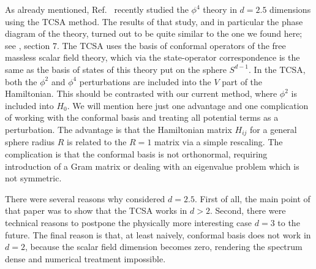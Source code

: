 \documentclass[11pt]{article}
\newcommand{\NO}[1]{{:\!#1\!:}}
\numberwithin{equation}{section}
\begin{document}
As already mentioned, Ref.~\cite{Hogervorst:2014rta} recently studied the $\phi^4$ theory in $d=2.5$ dimensions using the TCSA method. The results of that study, and in particular the phase diagram of the theory, turned out to be quite similar to the one we found here; see \cite{Hogervorst:2014rta}, section 7. The TCSA uses the basis of conformal operators of the free massless scalar field theory, which via the state-operator correspondence is the same as the basis of states of this theory put on the sphere $S^{d-1}$. In the TCSA, both the $\phi^2$ and $\phi^4$ perturbations are included into the $V$ part of the Hamiltonian. This should be contrasted with our current method, where $\phi^2$ is included into $H_0$. We will mention here just one advantage and one complication of working with the conformal basis and treating all potential terms as a perturbation. The advantage is that the Hamiltonian matrix $H_{ij}$ for a general sphere radius $R$ is related to the $R=1$ matrix via a simple rescaling. The complication is that the conformal basis is not orthonormal, requiring introduction of a Gram matrix or dealing with an eigenvalue problem which is not symmetric.

There were several reasons why \cite{Hogervorst:2014rta} considered $d=2.5$. First of all, the main point of that paper was to show that the TCSA works in $d>2$. Second, there were technical reasons to postpone the physically more interesting case $d=3$ to the future. The final reason is that, at least naively, conformal basis does not work in $d=2$, because the scalar field dimension becomes zero, rendering the spectrum dense and numerical treatment impossible.

\end{document}

